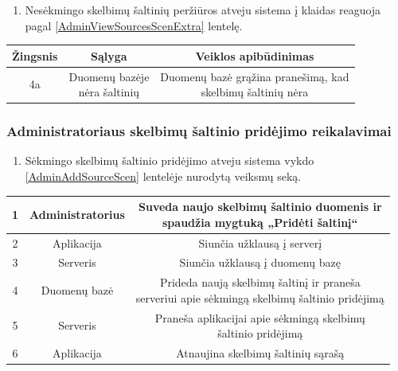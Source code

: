 \documentclass[12pt]{article}
\begin{document}
	\begin{enumerate}[resume,labelindent=10pt,leftmargin=2.2cm]
		\item Nesėkmingo skelbimų šaltinių peržiūros atveju sistema į klaidas reaguoja pagal \ref{AdminViewSourcesScenExtra} lentelę.
	\end{enumerate}
	
		\begin{center}
		\begin{tabular}{ | c | c | c | }
			\hline
			Žingsnis & Sąlyga         & Veiklos apibūdinimas \\ \hline
			4a       & \makecell{Duomenų bazėje \\ nėra šaltinių} & \makecell{Duomenų bazė grąžina pranešimą, kad \\ skelbimų šaltinių nėra} \\ \hline
		\end{tabular}
		\end{center}
		\pagebreak
	
	\subsubsection{Administratoriaus skelbimų šaltinio pridėjimo reikalavimai}
	\begin{enumerate}[labelindent=10pt,leftmargin=2.2cm]
		\item Sėkmingo skelbimų šaltinio pridėjimo atveju sistema vykdo \ref{AdminAddSourceScen} lentelėje nurodytą veiksmų seką.
	\end{enumerate}
		
		\begin{center}
		\begin{tabular}{ | c | c | c | }
			\hline
			1        & Administratorius & \makecell{Suveda naujo skelbimų šaltinio duomenis ir \\ spaudžia mygtuką „Pridėti šaltinį“ } \\ \hline
			2        & Aplikacija       & Siunčia užklausą į serverį \\ \hline
			3        & Serveris         & Siunčia užklausą į duomenų bazę \\ \hline
			4        & Duomenų bazė     & \makecell{Prideda naują skelbimų šaltinį ir praneša \\ serveriui apie sėkmingą skelbimų šaltinio pridėjimą} \\ \hline
			5        & Serveris         & \makecell{Praneša aplikacijai apie sėkmingą skelbimų \\ šaltinio pridėjimą} \\ \hline
			6        & Aplikacija       & Atnaujina skelbimų šaltinių sąrašą \\ \hline
		\end{tabular}
		\end{center}
		\bigskip
\end{document}
